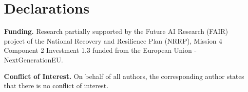 \documentclass[sn-mathphys]{sn-jnl}
\begin{document}
\section*{Declarations}


\textbf{Funding.} Research partially supported by the Future AI Research (FAIR) project of the National Recovery and Resilience Plan (NRRP), Mission 4 Component 2 Investment 1.3 funded from the European Union - NextGenerationEU.\smallskip

\noindent
\textbf{Conflict of Interest.} On behalf of all authors, the corresponding author states that there is no conflict of interest.



%
\end{document}
